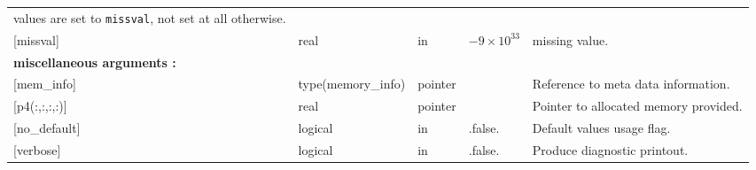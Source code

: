 {\begin{tabular}{|llllp{6cm}|}
values are set to {\tt missval}, not set at all otherwise.\\
{[missval]}    &real        &in& $-9\times10^{33}$& missing value.\\
\multicolumn{5}{|l|}{\bf miscellaneous arguments :}\\
{[mem\_info]}  &type(memory\_info)&pointer&&Reference to meta data information.\\
{[p4(:,:,:,:)]}&real              &pointer&& Pointer to allocated memory provided.\\
{[no\_default]}&logical         &in&.false.&Default values usage flag.\\
{[verbose]}    &logical         &in&.false.&Produce diagnostic printout.\\ 
\hline
\end{tabular}}

